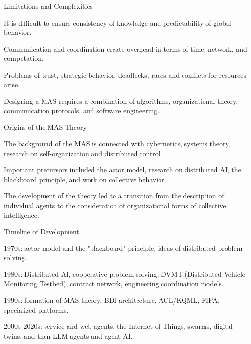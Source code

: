 \begin{frame}{Limitations and Complexities}
	\topline
	\justifying
	\begin{textitemize}
		\item It is difficult to ensure consistency of knowledge and predictability of global behavior.
		\item Communication and coordination create overhead in terms of time, network, and computation.
		\item Problems of trust, strategic behavior, deadlocks, races and conflicts for resources arise.
		\item Designing a MAS requires a combination of algorithms, organizational theory, communication protocols, and software engineering.
	\end{textitemize}
\end{frame}

\begin{frame}{Origins of the MAS Theory}
	\topline
	\justifying
	\begin{textitemize}
		\item The background of the MAS is connected with cybernetics, systems theory, research on self-organization and distributed control.
		\item Important precursors included the actor model, research on distributed AI, the blackboard principle{}, and work on collective behavior.
		\item The development of the theory led to a transition from the description of individual agents to the consideration of organizational forms of collective intelligence.
	\end{textitemize}
\end{frame}

\begin{frame}{Timeline of Development}
	\topline
	\justifying
	\begin{textitemize}
		\item 1970s: actor model and the "blackboard"{} principle, ideas of distributed problem solving.
		\item 1980s: Distributed AI, cooperative problem solving, DVMT (Distributed Vehicle Monitoring Testbed), contract network, engineering coordination models.
		\item 1990s: formation of MAS theory, BDI architecture, ACL/KQML, FIPA, specialized platforms.
		\item 2000s--2020s: service and web agents, the Internet of Things, swarms, digital twins, and then LLM agents and agent AI.
	\end{textitemize}
\end{frame}

